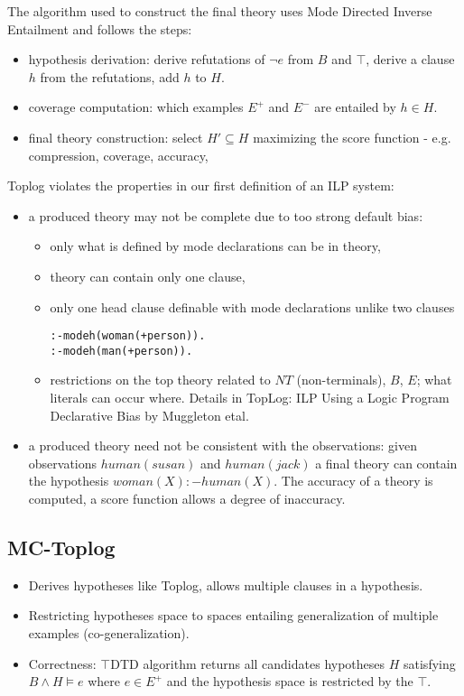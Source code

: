 The algorithm used to construct the final theory uses Mode Directed Inverse Entailment and follows the steps:
\begin{itemize}
\item hypothesis derivation: derive refutations of $\neg e$ from $B$ and $\top$, derive a clause $h$ from the refutations, add $h$ to $H$.
\item coverage computation: which examples $E^+$ and $E^-$ are entailed by $h \in H$.
\item final theory construction: select $H' \subseteq H$ maximizing the score function - e.g. compression, coverage, accuracy,
\end{itemize}
Toplog violates the properties in our first definition of an ILP system:
\begin{itemize}
\item a produced theory may not be complete due to too strong default bias:
\begin{itemize}
\item only what is defined by mode declarations can be in theory,
\item theory can contain only one clause,
\item only one head clause definable with mode declarations unlike two clauses
\begin{lstlisting}
:-modeh(woman(+person)).
:-modeh(man(+person)).
\end{lstlisting}

\item restrictions on the top theory related to $NT$ (non-terminals), $B$, $E$; what literals can occur where. Details in TopLog: ILP Using a Logic Program Declarative Bias by Muggleton etal.
\end{itemize}
\item a produced theory need not be consistent with the observations: given observations $human(susan)$ and $human(jack)$ a final theory can contain the hypothesis $woman(X) :- human(X)$. The accuracy of a theory is computed, a score function allows a degree of inaccuracy.
\end{itemize}

\subsection{MC-Toplog}
\begin{itemize}
\item Derives hypotheses like Toplog, allows multiple clauses in a hypothesis.
\item Restricting hypotheses space to spaces entailing generalization of multiple examples (co-generalization).
\item Correctness: $\top$DTD algorithm returns all candidates hypotheses $H$ satisfying $B \wedge H \models e$ where $e \in E^+$ and the hypothesis space is restricted by the $\top$.
\end{itemize}


